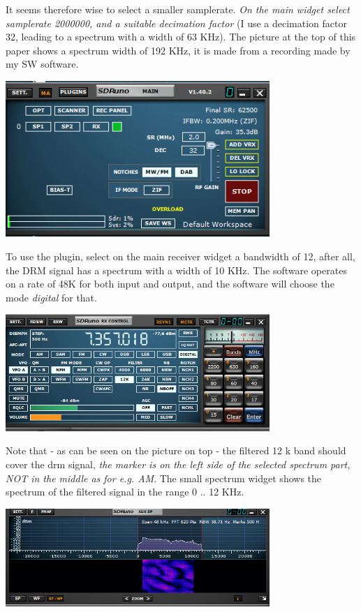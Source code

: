 \documentclass[10pt]{article}
\begin{document}
It seems therefore wise to select a smaller samplerate.
{\em On the main widget select samplerate 2000000, and a suitable
decimation factor} (I use a decimation factor 32, leading to a
spectrum with a width of 63 KHz).
The picture at the top of this paper shows a spectrum width of 192 KHz,
it is made from a recording made by my SW software.

\includegraphics[width=100mm]{drm-main-widget.png}

To use the plugin, select on the main receiver widget a bandwidth of 12,
after all, the  DRM signal has a spectrum with a width of 10 KHz.
The software operates on a rate of 48K for both input and output,
and the software will choose the mode {\em digital} for that.

\includegraphics[width=100mm]{drm-receiver-widget.png}

Note that - as can be seen on the picture on top - the filtered 12 k
band should cover the drm signal, {\em the marker is on the left side
of the selected spectrum part, NOT in the middle as for  e.g. AM}.
The small spectrum widget shows the spectrum of the filtered signal in the
range 0 .. 12 KHz.

\includegraphics[width=100mm]{drm-small-spectrum.png}
\end{document}
